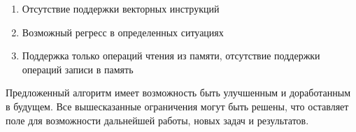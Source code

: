 \begin{enumerate}
    \item Отсутствие поддержки векторных инструкций
    \item Возможный регресс в определенных ситуациях
    \item Поддержка только операций чтения из памяти, отсутствие поддержки операций записи в память
\end{enumerate}

Предложенный алгоритм имеет возможность быть улучшенным и доработанным в будущем. Все вышесказанные ограничения могут быть решены, что оставляет поле для возможности дальнейшей работы, новых задач и результатов.
\newpage
